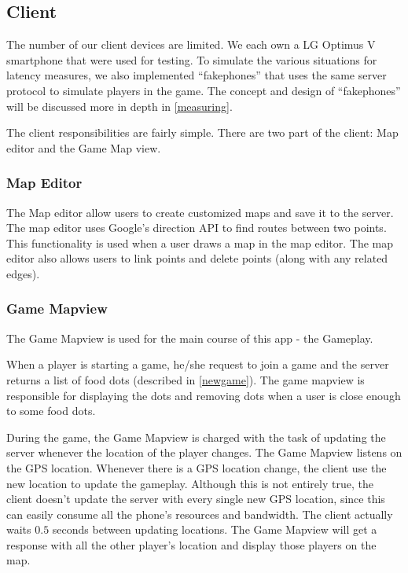 \documentclass{acm_proc_article-sp}
\begin{document}
\subsection{Client}

The number of our client devices are limited. We each own a LG Optimus
V smartphone that were used for testing. To simulate the various
situations for latency measures, we also implemented ``fakephones''
that uses the same server protocol to simulate players in the
game. The concept and design of ``fakephones'' will be discussed more
in depth in \ref{measuring}.

The client responsibilities are fairly simple. There are two part of
the client: Map editor and the Game Map view.

\subsubsection{Map Editor}
The Map editor allow users to create customized maps and save it to
the server. The map editor uses Google's direction API
\cite{GoogleDirection} to find routes between two points. This
functionality is used when a user draws a map in the map editor. The
map editor also allows users to link points and delete points (along
with any related edges).


\subsubsection{Game Mapview}
The Game Mapview is used for the main course of this app - the
Gameplay. 

When a player is starting a game, he/she request to join a game and
the server returns a list of food dots (described in
\ref{newgame}). The game mapview is responsible for displaying the
dots and removing dots when a user is close enough to some food dots.

During the game, the Game Mapview is charged with the task of updating
the server whenever the location of the player changes. The Game
Mapview listens on the GPS location. Whenever there is a GPS location
change, the client use the new location to update the
gameplay. Although this is not entirely true, the client doesn't
update the server with every single new GPS location, since this can
easily consume all the phone's resources and bandwidth. The client
actually waits $0.5$ seconds between updating locations. The Game
Mapview will get a response with all the other player's location and
display those players on the map.
\end{document}
